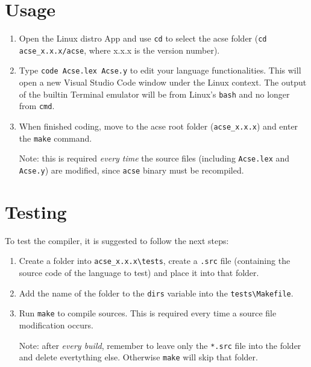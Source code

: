 \documentclass{article}
\begin{document}
\section{Usage}
\begin{enumerate}
  \item Open the Linux distro App and use \verb+cd+ to select the acse folder (\verb+cd acse_x.x.x/acse+, where x.x.x is the version number).
  \item Type \verb+code Acse.lex Acse.y+ to edit your language functionalities. This will open a new Visual Studio Code window under the Linux context. The output of the builtin Terminal emulator will be from Linux's \verb+bash+ and no longer from \verb+cmd+.
  \item When finished coding, move to the acse root folder (\verb+acse_x.x.x+) and enter the \verb+make+ command. \newline \newline \begin{small} Note: this is required \emph{every time} the source files (including \verb+Acse.lex+ and \verb+Acse.y+) are modified, since \verb+acse+ binary must be recompiled.\end{small}
\end{enumerate}
\section{Testing}
To test the compiler, it is suggested to follow the next steps:
\begin{enumerate}
  \item Create a folder into \verb+acse_x.x.x\tests+, create a \verb+.src+ file (containing the source code of the language to test) and place it into that folder.
  \item Add the name of the folder to the \verb+dirs+ variable into the \verb+tests\Makefile+.
  \item Run \verb+make+ to compile sources. This is required every time a source file modification occurs.
\newline\newline \begin{small}Note: after \emph{every build}, remember to leave only the \verb+*.src+ file into the folder and delete evertything else. Otherwise \verb+make+ will skip that folder.\end{small}
\end{enumerate}
\end{document}
